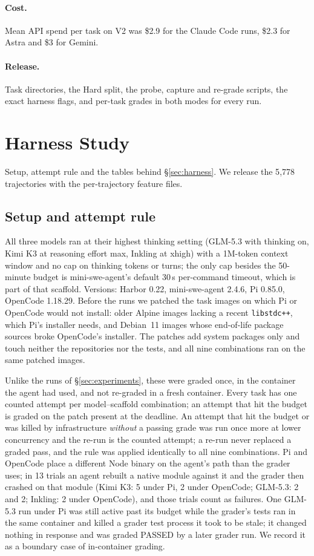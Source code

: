 \paragraph{Cost.} Mean API spend per task on V2 was \$2.9 for the Claude Code runs, \$2.3 for Astra and \$3 for Gemini.
\paragraph{Release.} Task directories, the Hard split, the probe, capture and re-grade scripts, the exact harness flags, and per-task grades in both modes for every run.

\section{Harness Study}
\label{app:harness}
Setup, attempt rule and the tables behind \S\ref{sec:harness}. We release the 5{,}778 trajectories with the per-trajectory feature files.

\subsection{Setup and attempt rule}
All three models ran at their highest thinking setting (GLM-5.3 with thinking on, Kimi K3 at reasoning effort max, Inkling at xhigh) with a 1M-token context window and no cap on thinking tokens or turns; the only cap besides the 50-minute budget is mini-swe-agent's default 30\,s per-command timeout, which is part of that scaffold. Versions: Harbor 0.22, mini-swe-agent 2.4.6, Pi 0.85.0, OpenCode 1.18.29. Before the runs we patched the task images on which Pi or OpenCode would not install: older Alpine images lacking a recent \texttt{libstdc++}, which Pi's installer needs, and Debian~11 images whose end-of-life package sources broke OpenCode's installer. The patches add system packages only and touch neither the repositories nor the tests, and all nine combinations ran on the same patched images.

Unlike the runs of \S\ref{sec:experiments}, these were graded once, in the container the agent had used, and not re-graded in a fresh container. Every task has one counted attempt per model--scaffold combination; an attempt that hit the budget is graded on the patch present at the deadline. An attempt that hit the budget or was killed by infrastructure \emph{without} a passing grade was run once more at lower concurrency and the re-run is the counted attempt; a re-run never replaced a graded pass, and the rule was applied identically to all nine combinations. Pi and OpenCode place a different Node binary on the agent's path than the grader uses; in 13 trials an agent rebuilt a native module against it and the grader then crashed on that module (Kimi K3: 5 under Pi, 2 under OpenCode; GLM-5.3: 2 and 2; Inkling: 2 under OpenCode), and those trials count as failures. One GLM-5.3 run under Pi was still active past its budget while the grader's tests ran in the same container and killed a grader test process it took to be stale; it changed nothing in response and was graded \textsc{PASSED} by a later grader run. We record it as a boundary case of in-container grading.

